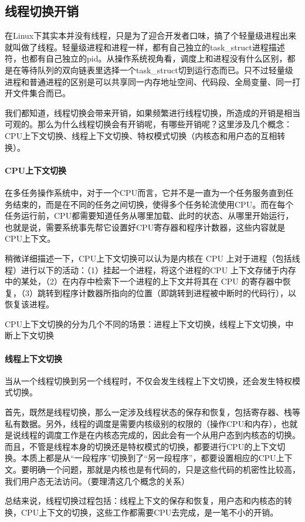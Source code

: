 \documentclass[../../../interview-questions.tex]{subfiles}
\begin{document}
\subsection{线程切换开销}

在Linux下其实本并没有线程，只是为了迎合开发者口味，搞了个轻量级进程出来就叫做了线程。轻量级进程和进程一样，都有自己独立的task\_struct进程描述符，也都有自己独立的pid。从操作系统视角看，调度上和进程没有什么区别，都是在等待队列的双向链表里选择一个task\_struct切到运行态而已。只不过轻量级进程和普通进程的区别是可以共享同一内存地址空间、代码段、全局变量、同一打开文件集合而已。

我们都知道，线程切换会带来开销，如果频繁进行线程切换，所造成的开销是相当可观的。那么为什么线程切换会有开销呢，有哪些开销呢？这里涉及几个概念：CPU上下文切换、线程上下文切换、特权模式切换（内核态和用户态的互相转换）。

\paragraph{CPU上下文切换}

在多任务操作系统中，对于一个CPU而言，它并不是一直为一个任务服务直到任务结束的，而是在不同的任务之间切换，使得多个任务轮流使用CPU。而在每个任务运行前，CPU都需要知道任务从哪里加载、此时的状态、从哪里开始运行，也就是说，需要系统事先帮它设置好CPU寄存器和程序计数器，这些内容就是CPU上下文。

稍微详细描述一下，CPU上下文切换可以认为是内核在 CPU 上对于进程（包括线程）进行以下的活动：（1）挂起一个进程，将这个进程的CPU 上下文存储于内存中的某处，（2）在内存中检索下一个进程的上下文并将其在 CPU 的寄存器中恢复，（3）跳转到程序计数器所指向的位置（即跳转到进程被中断时的代码行），以恢复该进程。

CPU上下文切换的分为几个不同的场景：进程上下文切换，线程上下文切换，中断上下文切换

\paragraph{线程上下文切换}

当从一个线程切换到另一个线程时，不仅会发生线程上下文切换，还会发生特权模式切换。

首先，既然是线程切换，那么一定涉及线程状态的保存和恢复，包括寄存器、栈等私有数据。另外，线程的调度是需要内核级别的权限的（操作CPU和内存），也就是说线程的调度工作是在内核态完成的，因此会有一个从用户态到内核态的切换。而且，不管是线程本身的切换还是特权模式的切换，都要进行CPU的上下文切换。本质上都是从“一段程序”切换到了“另一段程序”，都要设置相应的CPU上下文。要明确一个问题，那就是内核也是有代码的，只是这些代码的机密性比较高，我们用户态无法访问。（要理清这几个概念的关系）

总结来说，线程切换过程包括：线程上下文的保存和恢复，用户态和内核态的转换，CPU上下文的切换，这些工作都需要CPU去完成，是一笔不小的开销。
\end{document}
